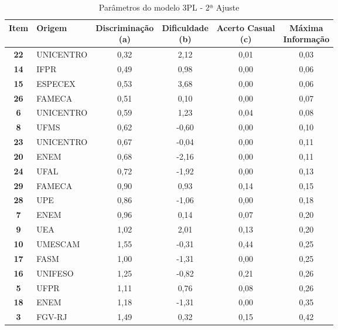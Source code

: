\begin{table}[h]
	\centering
		\caption{Parâmetros do modelo 3PL - 2ª Ajuste}
		\label{tabela-coef3-excl}
		\begin{tabular}{clcccc}
			\hline
			\textbf{Item}  & \textbf{Origem} & 
			\makecell{\textbf{Discriminação} \\\textbf{(a)}}& 
			\makecell{\textbf{Dificuldade} \\\textbf{ (b)}} &
			\makecell{\textbf{Acerto Casual} \\\textbf{(c})} &
			\makecell{\textbf{Máxima} \\ \textbf{Informação}} 
			\\ 
		\hline \textbf{22} & UNICENTRO & 0,32 & 2,12 & 0,01 & 0,03 \\ 
		\hline \textbf{14} & IFPR & 0,49 & 0,98 & 0,00 & 0,06 \\ 
		\hline \textbf{15} & ESPECEX & 0,53 & 3,68 & 0,00 & 0,06 \\ 
		\hline \textbf{26} & FAMECA & 0,51 & 0,10 & 0,00 & 0,07 \\ 
		\hline \textbf{6 }& UNICENTRO & 0,59 & 1,23 & 0,04 & 0,08 \\ 
		\hline \textbf{8 }& UFMS & 0,62 & -0,60 & 0,00 & 0,10 \\ 
		\hline \textbf{23} & UNICENTRO & 0,67 & -0,04 & 0,00 & 0,11 \\ 
		\hline \textbf{20} & ENEM & 0,68 & -2,16 & 0,00 & 0,11 \\ 
		\hline \textbf{24} & UFAL & 0,72 & -1,92 & 0,00 & 0,13 \\ 
		\hline \textbf{29} & FAMECA & 0,90 & 0,93 & 0,14 & 0,15 \\ 
		\hline \textbf{28} & UPE & 0,86 & -1,06 & 0,00 & 0,18 \\ 
		\hline \textbf{7 }& ENEM & 0,96 & 0,14 & 0,07 & 0,20 \\ 
		\hline \textbf{9 }& UEA & 1,02 & 2,01 & 0,13 & 0,20 \\ 
		\hline \textbf{10} & UMESCAM & 1,55 & -0,31 & 0,44 & 0,25 \\ 
		\hline \textbf{17} & FASM & 1,00 & -1,31 & 0,00 & 0,25 \\ 
		\hline \textbf{16} & UNIFESO & 1,25 & -0,82 & 0,21 & 0,26 \\ 
		\hline \textbf{5 }& UFPR & 1,11 & 0,76 & 0,08 & 0,26 \\ 
		\hline \textbf{18} & ENEM & 1,18 & -1,31 & 0,00 & 0,35 \\ 
		\hline \textbf{3 }& FGV-RJ & 1,49 & 0,32 & 0,15 & 0,42 \\ 

\end{tabular}
\end{table}
